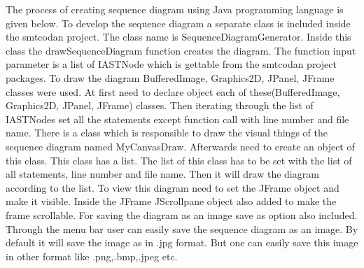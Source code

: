 The process of creating sequence diagram using Java programming language is given below. To develop the sequence diagram a separate class is included inside the smtcodan project. The class name is SequenceDiagramGenerator. Inside this class the drawSequenceDiagram function creates the diagram. The function input parameter is a list of IASTNode which is gettable from the smtcodan project packages. To draw the diagram BufferedImage, Graphics2D, JPanel, JFrame  classes were used. At first need to declare object each of these(BufferedImage, Graphics2D, JPanel, JFrame) classes. Then iterating through the list of IASTNodes set all the statements except function call with line number and file name. There is a class which is responsible to draw the visual things of the sequence diagram named MyCanvasDraw. Afterwards need to create an object of this class. This class has a list. The list of this class has to be set with the list of all statements, line number  and file name. Then it will draw the diagram according to the list. To view this diagram need to set the JFrame object and make it visible. Inside the JFrame JScrollpane object also added to make the frame scrollable. For saving the diagram as an image save as option also included. Through the menu bar user can easily save the sequence diagram as an image. By default it will save the image as in .jpg format. But one can easily save this image in other format like .png,.bmp,.jpeg etc.  


